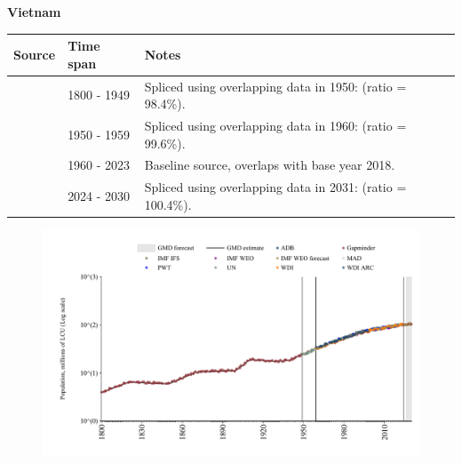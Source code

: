 \documentclass[12pt,a4paper,landscape]{article}
\begin{document}
\begin{adjustbox}{max totalsize={\paperwidth}{\paperheight},center}
\begin{minipage}[t][\textheight][t]{\textwidth}
\vspace*{0.5cm}
{}
\begin{center}
{\Large\bfseries Vietnam}
\end{center}
\vspace{0.5cm}
\begin{table}[H]
\centering
\small
\begin{tabular}{|l|l|l|}
\hline
\textbf{Source} & \textbf{Time span} & \textbf{Notes} \\
\hline
\rowcolor{white}\cite{Gapminder}& 1800 - 1949 &Spliced using overlapping data in 1950: (ratio = 98.4\%).\\
\rowcolor{lightgray}\cite{IMF_IFS}& 1950 - 1959 &Spliced using overlapping data in 1960: (ratio = 99.6\%).\\
\rowcolor{white}\cite{WDI}& 1960 - 2023 &Baseline source, overlaps with base year 2018.\\
\rowcolor{lightgray}\cite{Gapminder}& 2024 - 2030 &Spliced using overlapping data in 2031: (ratio = 100.4\%).\\
\hline
\end{tabular}
\end{table}
\begin{figure}[H]
\centering
\includegraphics[width=\textwidth,height=0.6\textheight,keepaspectratio]{graphs/VNM_pop.pdf}
\end{figure}
\end{minipage}
\end{adjustbox}
\end{document}
